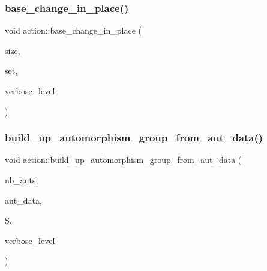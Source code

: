 \mbox{\label{classaction_a035960aa89ff1aec59f868c15fc63d50}} 
\subsubsection{\texorpdfstring{base\+\_\+change\+\_\+in\+\_\+place()}{base\_change\_in\_place()}}
{\footnotesize\ttfamily void action\+::base\+\_\+change\+\_\+in\+\_\+place (\begin{DoxyParamCaption}\item[{\mbox{\hyperlink{galois_8h_a09fddde158a3a20bd2dcadb609de11dc}{I\+NT}}}]{size,  }\item[{\mbox{\hyperlink{galois_8h_a09fddde158a3a20bd2dcadb609de11dc}{I\+NT}} $\ast$}]{set,  }\item[{\mbox{\hyperlink{galois_8h_a09fddde158a3a20bd2dcadb609de11dc}{I\+NT}}}]{verbose\+\_\+level }\end{DoxyParamCaption})}

\mbox{\label{classaction_af291f2c50068aa2d656041f3f731d91b}} 
\subsubsection{\texorpdfstring{build\+\_\+up\+\_\+automorphism\+\_\+group\+\_\+from\+\_\+aut\+\_\+data()}{build\_up\_automorphism\_group\_from\_aut\_data()}}
{\footnotesize\ttfamily void action\+::build\+\_\+up\+\_\+automorphism\+\_\+group\+\_\+from\+\_\+aut\+\_\+data (\begin{DoxyParamCaption}\item[{\mbox{\hyperlink{galois_8h_a09fddde158a3a20bd2dcadb609de11dc}{I\+NT}}}]{nb\+\_\+auts,  }\item[{\mbox{\hyperlink{galois_8h_a09fddde158a3a20bd2dcadb609de11dc}{I\+NT}} $\ast$}]{aut\+\_\+data,  }\item[{\mbox{\hyperlink{classsims}{sims}} \&}]{S,  }\item[{\mbox{\hyperlink{galois_8h_a09fddde158a3a20bd2dcadb609de11dc}{I\+NT}}}]{verbose\+\_\+level }\end{DoxyParamCaption})}

